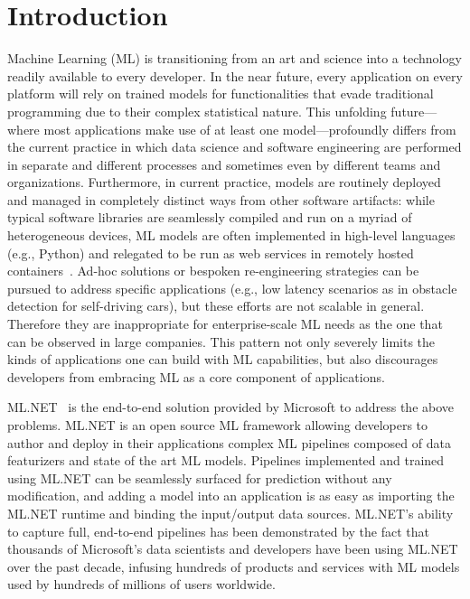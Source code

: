 \documentclass[11pt]{article}
\newcommand{\mlnet}{ML.NET\xspace}
\newcommand{\msft}{Microsoft\xspace}
\begin{document}
\section{Introduction}
Machine Learning (ML) is transitioning from an art and science into a technology readily available to every developer.
In the near future, every application on every platform will rely on trained models for functionalities that evade traditional programming due to their complex statistical nature.
This unfolding future---where most applications make use of at least one model---profoundly differs from the current practice in which data science and software engineering are performed in separate and different processes and sometimes even by different teams and organizations. Furthermore, in current practice, models are routinely deployed and managed in completely distinct ways from other software artifacts: while typical software libraries are seamlessly compiled and run on a myriad of heterogeneous devices, ML models are often implemented in high-level languages (e.g., Python) and relegated to be run as web services in remotely hosted containers~\cite{clipper,mms,tf-serving,clipper-nsdi,tf-serving2}. 
Ad-hoc solutions or bespoken re-engineering strategies can be pursued to address specific applications (e.g., low latency scenarios as in obstacle detection for self-driving cars), but these efforts are not scalable in general. Therefore they are inappropriate for enterprise-scale ML needs as the one that can be observed in large companies.
This pattern not only severely limits the kinds of applications one can build with ML capabilities, but also discourages developers from embracing ML as a core component of applications.

\mlnet~\cite{mldotnet} is the end-to-end solution provided by \msft to address the above problems. \mlnet is an open source ML framework allowing developers to author and deploy in their applications complex ML pipelines composed of data featurizers and state of the art ML models. 
Pipelines implemented and trained using \mlnet can be seamlessly surfaced for prediction without any modification, and adding a model into an application is as easy as importing the \mlnet runtime and binding the input/output data sources.
\mlnet's ability to capture full, end-to-end pipelines has been demonstrated by the fact that
thousands of \msft's data scientists and developers have been using \mlnet over the past decade, infusing hundreds of products and services with ML models used by hundreds of millions of users worldwide. 
\end{document}
